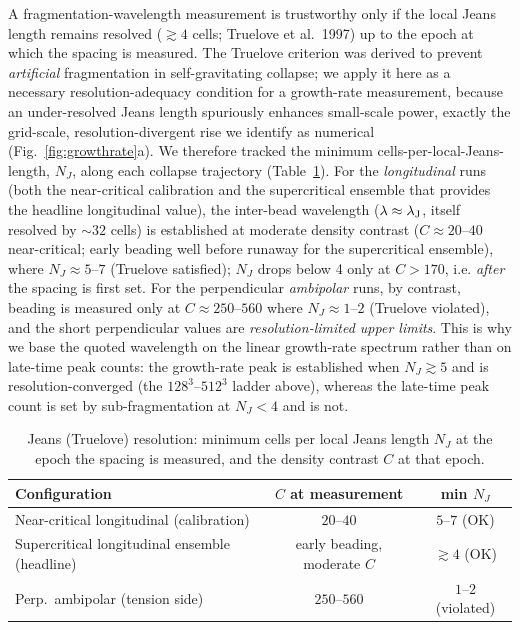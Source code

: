 \documentclass[usenatbib,twoside,twocolumn]{mnras}
\begin{document}
A fragmentation-wavelength measurement is trustworthy only if the local Jeans length remains resolved ($\gtrsim4$ cells; Truelove et al.\ 1997) up to the epoch at which the spacing is measured. The Truelove criterion was derived to prevent \emph{artificial} fragmentation in self-gravitating collapse; we apply it here as a necessary resolution-adequacy condition for a growth-rate measurement, because an under-resolved Jeans length spuriously enhances small-scale power, exactly the grid-scale, resolution-divergent rise we identify as numerical (Fig.~\ref{fig:growthrate}a). We therefore tracked the minimum cells-per-local-Jeans-length, $N_J$, along each collapse trajectory (Table~\ref{tab:truelove}). For the \emph{longitudinal} runs (both the near-critical calibration and the supercritical ensemble that provides the headline longitudinal value), the inter-bead wavelength ($\lambda\approx\lambda_{\rm J}$, itself resolved by $\sim32$ cells) is established at moderate density contrast ($C\approx20$--$40$ near-critical; early beading well before runaway for the supercritical ensemble), where $N_J\approx5$--$7$ (Truelove satisfied); $N_J$ drops below 4 only at $C>170$, i.e. \emph{after} the spacing is first set. For the perpendicular \emph{ambipolar} runs, by contrast, beading is measured only at $C\approx250$--$560$ where $N_J\approx1$--$2$ (Truelove violated), and the short perpendicular values are \emph{resolution-limited upper limits}. This is why we base the quoted wavelength on the linear growth-rate spectrum rather than on late-time peak counts: the growth-rate peak is established when $N_J\gtrsim5$ and is resolution-converged (the $128^3$--$512^3$ ladder above), whereas the late-time peak count is set by sub-fragmentation at $N_J<4$ and is not.

\begin{table}
\caption{Jeans (Truelove) resolution: minimum cells per local Jeans length $N_J$ at the epoch the spacing is measured, and the density contrast $C$ at that epoch.}
\label{tab:truelove}
\footnotesize
\setlength{\tabcolsep}{4pt}
\begin{tabular}{p{3.6cm}cc}
\toprule
Configuration & $C$ at measurement & min $N_J$ \\
\midrule
Near-critical longitudinal (calibration) & $20$--$40$ & $5$--$7$ (OK) \\
Supercritical longitudinal ensemble (headline) & early beading, moderate $C$ & $\gtrsim4$ (OK) \\
Perp.\ ambipolar (tension side) & $250$--$560$ & $1$--$2$ (violated) \\
\bottomrule
\end{tabular}
\end{table}
\end{document}
